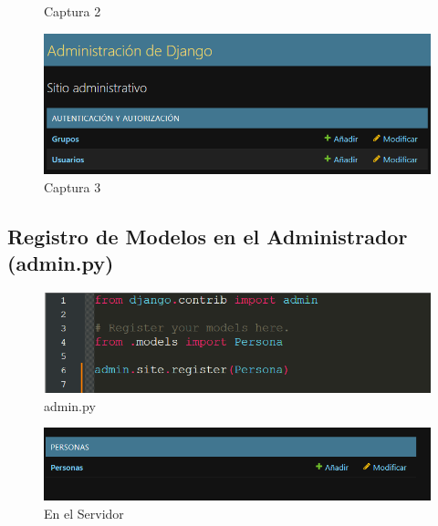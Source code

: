 \documentclass{article}
\begin{document}
\begin{itemize}
\begin{figure}[H]
      \caption{Captura 2}
    \end{figure}
    \begin{figure}[H]
      \centering
      \includegraphics[width=1\textwidth, keepaspectratio]{img/admin2.png}
      \caption{Captura 3}
    \end{figure}
  \end{itemize}
  

  \subsection{Registro de Modelos en el Administrador (admin.py)}
  \begin{figure}[H]
    \centering
    \includegraphics[width=1\textwidth, keepaspectratio]{img/administrador.png}
    \caption{admin.py}
  \end{figure}
  \begin{figure}[H]
    \centering
    \includegraphics[width=1\textwidth, keepaspectratio]{img/server.png}
    \caption{En el Servidor}
  \end{figure}
  
\end{document}
